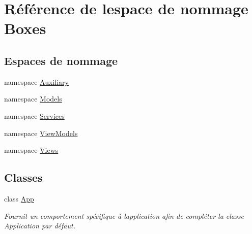 \hypertarget{namespace_boxes}{}\section{Référence de l\textquotesingle{}espace de nommage Boxes}
\label{namespace_boxes}
\subsection*{Espaces de nommage}
\begin{DoxyCompactItemize}
\item 
namespace \hyperlink{namespace_boxes_1_1_auxiliary}{Auxiliary}
\item 
namespace \hyperlink{namespace_boxes_1_1_models}{Models}
\item 
namespace \hyperlink{namespace_boxes_1_1_services}{Services}
\item 
namespace \hyperlink{namespace_boxes_1_1_view_models}{View\+Models}
\item 
namespace \hyperlink{namespace_boxes_1_1_views}{Views}
\end{DoxyCompactItemize}
\subsection*{Classes}
\begin{DoxyCompactItemize}
\item 
class \hyperlink{class_boxes_1_1_app}{App}
\begin{DoxyCompactList}\small\item\em Fournit un comportement spécifique à l\textquotesingle{}application afin de compléter la classe Application par défaut. \end{DoxyCompactList}\end{DoxyCompactItemize}
